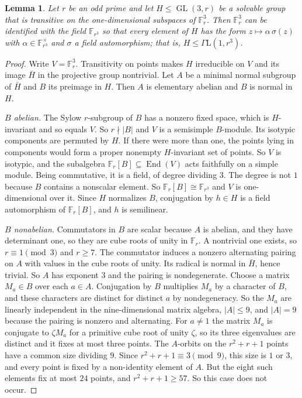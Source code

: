 \documentclass[11pt]{amsart}
\newtheorem{lemma}[theorem]{Lemma}
\theoremstyle{definition}
\theoremstyle{remark}
\newcommand{\F}{\mathbb{F}}
\newcommand{\GL}{\operatorname{GL}}
\newcommand{\GaL}{\Gamma\mathrm{L}}
\begin{document}
\begin{lemma}\label{lem:linear}
Let $r$ be an odd prime and let $H\le\GL(3,r)$ be a solvable group that is transitive on the one-dimensional subspaces of $\F_r^3$. Then $\F_r^3$ can be identified with the field $\F_{r^3}$ so that every element of $H$ has the form $z\mapsto\alpha\,\sigma(z)$ with $\alpha\in\F_{r^3}^\times$ and $\sigma$ a field automorphism; that is, $H\le\GaL(1,r^3)$.
\end{lemma}
\begin{proof}
Write $V=\F_r^3$. Transitivity on points makes $H$ irreducible on $V$ and its image $\bar H$ in the projective group nontrivial. Let $A$ be a minimal normal subgroup of $\bar H$ and $B$ its preimage in $H$. Then $A$ is elementary abelian and $B$ is normal in $H$.

\emph{$B$ abelian.} The Sylow $r$-subgroup of $B$ has a nonzero fixed space, which is $H$-invariant and so equals $V$. So $r\nmid|B|$ and $V$ is a semisimple $B$-module. Its isotypic components are permuted by $H$. If there were more than one, the points lying in components would form a proper nonempty $H$-invariant set of points. So $V$ is isotypic, and the subalgebra $\F_r[B]\subseteq\operatorname{End}(V)$ acts faithfully on a simple module. Being commutative, it is a field, of degree dividing $3$. The degree is not $1$ because $B$ contains a nonscalar element. So $\F_r[B]\cong\F_{r^3}$ and $V$ is one-dimensional over it. Since $H$ normalizes $B$, conjugation by $h\in H$ is a field automorphism of $\F_r[B]$, and $h$ is semilinear.

\emph{$B$ nonabelian.} Commutators in $B$ are scalar because $A$ is abelian, and they have determinant one, so they are cube roots of unity in $\F_r$. A nontrivial one exists, so $r\equiv1\pmod3$ and $r\ge7$. The commutator induces a nonzero alternating pairing on $A$ with values in the cube roots of unity. Its radical is normal in $\bar H$, hence trivial. So $A$ has exponent $3$ and the pairing is nondegenerate. Choose a matrix $M_a\in B$ over each $a\in A$. Conjugation by $B$ multiplies $M_a$ by a character of $B$, and these characters are distinct for distinct $a$ by nondegeneracy. So the $M_a$ are linearly independent in the nine-dimensional matrix algebra, $|A|\le9$, and $|A|=9$ because the pairing is nonzero and alternating. For $a\ne1$ the matrix $M_a$ is conjugate to $\zeta M_a$ for a primitive cube root of unity $\zeta$, so its three eigenvalues are distinct and it fixes at most three points. The $A$-orbits on the $r^2+r+1$ points have a common size dividing $9$. Since $r^2+r+1\equiv3\pmod9$, this size is $1$ or $3$, and every point is fixed by a non-identity element of $A$. But the eight such elements fix at most $24$ points, and $r^2+r+1\ge57$. So this case does not occur.
\end{proof}
\end{document}
